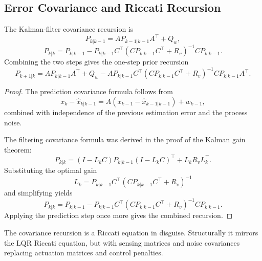 \subsection{Error Covariance and Riccati Recursion}
\label{sec:l7-error-covariance-and-riccati-recursion}

\begin{theorem}\label{thm:l7-riccati-recursion-for-the-error-covariance}
	The Kalman-filter covariance recursion is
	\[
		P_{k|k-1}=A P_{k-1|k-1}A^\top + Q_w,
	\]
	\[
		P_{k|k}
		=
		P_{k|k-1}
		-
		P_{k|k-1}C^\top\left(CP_{k|k-1}C^\top+R_v\right)^{-1}CP_{k|k-1}.
	\]
	Combining the two steps gives the one-step prior recursion
	\[
		P_{k+1|k}
		=
		A P_{k|k-1}A^\top + Q_w
		-
		A P_{k|k-1}C^\top\left(CP_{k|k-1}C^\top+R_v\right)^{-1}CP_{k|k-1}A^\top.
	\]
\end{theorem}
\begin{proof}
	The prediction covariance formula follows from
	\[
		x_k-\hat x_{k|k-1} = A(x_{k-1}-\hat x_{k-1|k-1}) + w_{k-1},
	\]
	combined with independence of the previous estimation error and the process noise.

	The filtering covariance formula was derived in the proof of the Kalman gain theorem:
	\[
		P_{k|k}
		=
		(I-L_k C)P_{k|k-1}(I-L_k C)^\top + L_k R_v L_k^\top.
	\]
	Substituting the optimal gain
	\[
		L_k = P_{k|k-1}C^\top\left(CP_{k|k-1}C^\top+R_v\right)^{-1}
	\]
	and simplifying yields
	\[
		P_{k|k}
		=
		P_{k|k-1}
		-
		P_{k|k-1}C^\top\left(CP_{k|k-1}C^\top+R_v\right)^{-1}CP_{k|k-1}.
	\]
	Applying the prediction step once more gives the combined recursion.
\end{proof}

\begin{remark}
	The covariance recursion is a Riccati equation in disguise. Structurally it mirrors the LQR Riccati equation, but with sensing matrices and noise covariances replacing actuation matrices and control penalties.
\end{remark}

